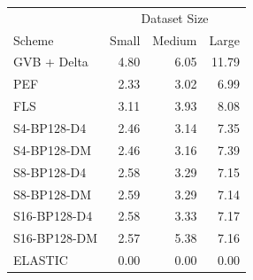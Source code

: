\begin{tabular}{lrrr}
\toprule
 & \multicolumn{3}{c}{Dataset Size} \\
Scheme & Small & Medium & Large \\
\midrule
GVB + Delta & 4.80 & 6.05 & 11.79 \\
PEF & 2.33 & 3.02 & 6.99 \\
FLS & 3.11 & 3.93 & 8.08 \\
S4-BP128-D4 & 2.46 & 3.14 & 7.35 \\
S4-BP128-DM & 2.46 & 3.16 & 7.39 \\
S8-BP128-D4 & 2.58 & 3.29 & 7.15 \\
S8-BP128-DM & 2.59 & 3.29 & 7.14 \\
S16-BP128-D4 & 2.58 & 3.33 & 7.17 \\
S16-BP128-DM & 2.57 & 5.38 & 7.16 \\
ELASTIC & 0.00 & 0.00 & 0.00 \\
\bottomrule
\end{tabular}

